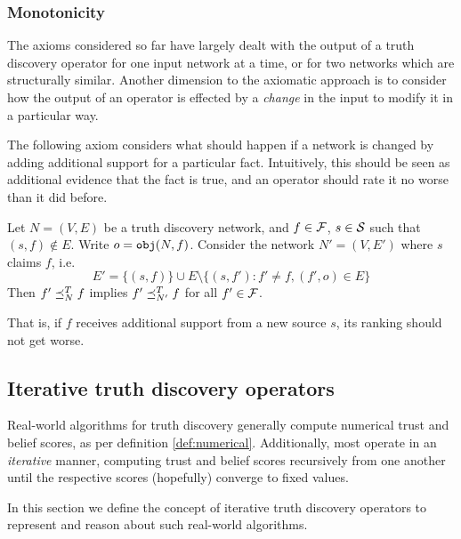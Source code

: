 \documentclass[../main.tex]{subfiles}
\begin{document}
\subsubsection{Monotonicity}

The axioms considered so far have largely dealt with the output of a truth
discovery operator for one input network at a time, or for two networks which
are structurally similar. Another dimension to the axiomatic approach is to
consider how the output of an operator is effected by a \emph{change} in the
input to modify it in a particular way.

The following axiom considers what should happen if a network is changed by
adding additional support for a particular fact. Intuitively, this should be
seen as additional evidence that the fact is true, and an operator should rate
it no worse than it did before.


\begin{axiom}[Monotonicity]
Let $N = (V, E)$ be a truth discovery network, and $f \in \F$, $s \in \S$ such
that $(s, f) \notin E$. Write $o = \obj(N, f)$. Consider the network $N'=(V,
E')$ where $s$ claims $f$, i.e.
$$
    E' = \{(s, f)\} \cup E \setminus \{(s, f') : f' \ne f, (f', o) \in E\}
$$
Then $f' \fle_N^T f$ implies $f' \fle_{N'}^T f$ for all $f' \in \F$.

That is, if $f$ receives additional support from a new source $s$, its ranking
should not get worse.
\end{axiom}



\subsection{Iterative truth discovery operators}

Real-world algorithms for truth discovery generally compute numerical trust and
belief scores, as per definition \ref{def:numerical}. Additionally, most
operate in an \emph{iterative} manner, computing trust and belief scores
recursively from one another until the respective scores (hopefully) converge
to fixed values.

In this section we define the concept of iterative truth discovery operators to
represent and reason about such real-world algorithms.
\end{document}
